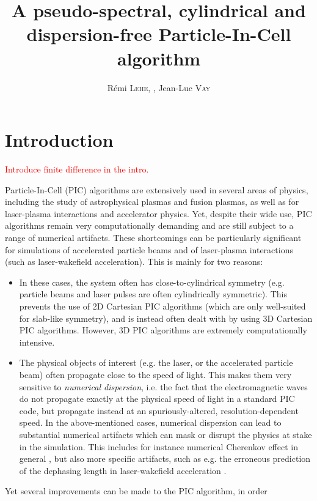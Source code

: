 \documentclass[a4paper]{article}   	%
\title{A pseudo-spectral, cylindrical and dispersion-free Particle-In-Cell algorithm}
\author{R\'emi \textsc{Lehe}, \comment{Igor \textsc{Andriyash} ?}, Jean-Luc \textsc{Vay}}
\newcommand{\comment}[1]{\textcolor{red}{#1}}
\begin{document}
\maketitle


\section*{Introduction}

\comment{ Introduce finite difference in the intro.}

Particle-In-Cell (PIC) algorithms\citep{Birdsall2004,Hockney1988} 
are extensively used in several areas of physics, including the study
of astrophysical plasmas and fusion plasmas,
as well as for laser-plasma interactions and accelerator physics. Yet,
despite their wide use, PIC algorithms remain very computationally
demanding and are still subject to a range of numerical artifacts. 
These shortcomings can be particularly significant for
simulations of accelerated particle beams and of 
laser-plasma interactions (such as laser-wakefield acceleration). 
This is mainly for two reasons:
\begin{itemize}
\item In these cases, the system often has close-to-cylindrical
  symmetry (e.g. particle beams and laser pulses are often
  cylindrically symmetric). This prevents the use of 2D Cartesian 
PIC algorithms (which are only well-suited for slab-like symmetry),
and is instead often dealt with by using
  3D Cartesian PIC algorithms. However, 3D PIC algorithms are extremely
  computationally intensive.
\item The physical objects of interest (e.g. the laser, or the
  accelerated particle beam) often propagate close to the speed of
  light. This makes them very sensitive to \emph{numerical
    dispersion}, i.e. the fact that the electromagnetic waves do not
  propagate exactly at the physical speed of light in a standard PIC
  code, but propagate instead at an spuriously-altered,
  resolution-dependent speed. In the above-mentioned cases, 
numerical dispersion can lead to substantial numerical artifacts
which can mask or disrupt the physics at stake in the simulation. This
includes for instance numerical Cherenkov effect in general
\citep{GodfreyJCP1974}, but also more specific artifacts, such as
e.g. the erroneous prediction of the dephasing length in
laser-wakefield acceleration \citep{CowanPRSTAB2013}.

\end{itemize}
Yet several improvements can be made to the PIC algorithm, in order
\end{document}
